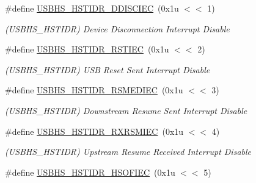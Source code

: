 \begin{DoxyCompactItemize}
\mbox{\label{group__SAMS70__USBHS_gae7c9ec90aa2f4d31dcf59aa75706904b}} 
\#define \mbox{\hyperlink{group__SAMS70__USBHS_gae7c9ec90aa2f4d31dcf59aa75706904b}{U\+S\+B\+H\+S\+\_\+\+H\+S\+T\+I\+D\+R\+\_\+\+D\+D\+I\+S\+C\+I\+EC}}~(0x1u $<$$<$ 1)
\begin{DoxyCompactList}\small\item\em (U\+S\+B\+H\+S\+\_\+\+H\+S\+T\+I\+DR) Device Disconnection Interrupt Disable \end{DoxyCompactList}\item 
\mbox{\label{group__SAMS70__USBHS_ga08e59c5e9f7b06336c5891b816818d20}} 
\#define \mbox{\hyperlink{group__SAMS70__USBHS_ga08e59c5e9f7b06336c5891b816818d20}{U\+S\+B\+H\+S\+\_\+\+H\+S\+T\+I\+D\+R\+\_\+\+R\+S\+T\+I\+EC}}~(0x1u $<$$<$ 2)
\begin{DoxyCompactList}\small\item\em (U\+S\+B\+H\+S\+\_\+\+H\+S\+T\+I\+DR) U\+SB Reset Sent Interrupt Disable \end{DoxyCompactList}\item 
\mbox{\label{group__SAMS70__USBHS_ga7c699747f489cbb80ea42c95a9d6a8d0}} 
\#define \mbox{\hyperlink{group__SAMS70__USBHS_ga7c699747f489cbb80ea42c95a9d6a8d0}{U\+S\+B\+H\+S\+\_\+\+H\+S\+T\+I\+D\+R\+\_\+\+R\+S\+M\+E\+D\+I\+EC}}~(0x1u $<$$<$ 3)
\begin{DoxyCompactList}\small\item\em (U\+S\+B\+H\+S\+\_\+\+H\+S\+T\+I\+DR) Downstream Resume Sent Interrupt Disable \end{DoxyCompactList}\item 
\mbox{\label{group__SAMS70__USBHS_gae0e07a0dbd66d3c04b103b99476029d1}} 
\#define \mbox{\hyperlink{group__SAMS70__USBHS_gae0e07a0dbd66d3c04b103b99476029d1}{U\+S\+B\+H\+S\+\_\+\+H\+S\+T\+I\+D\+R\+\_\+\+R\+X\+R\+S\+M\+I\+EC}}~(0x1u $<$$<$ 4)
\begin{DoxyCompactList}\small\item\em (U\+S\+B\+H\+S\+\_\+\+H\+S\+T\+I\+DR) Upstream Resume Received Interrupt Disable \end{DoxyCompactList}\item 
\mbox{\label{group__SAMS70__USBHS_gafe37ad9df8dcc435346c4a9dd26c8276}} 
\#define \mbox{\hyperlink{group__SAMS70__USBHS_gafe37ad9df8dcc435346c4a9dd26c8276}{U\+S\+B\+H\+S\+\_\+\+H\+S\+T\+I\+D\+R\+\_\+\+H\+S\+O\+F\+I\+EC}}~(0x1u $<$$<$ 5)
$$
\end{DoxyCompactItemize}
